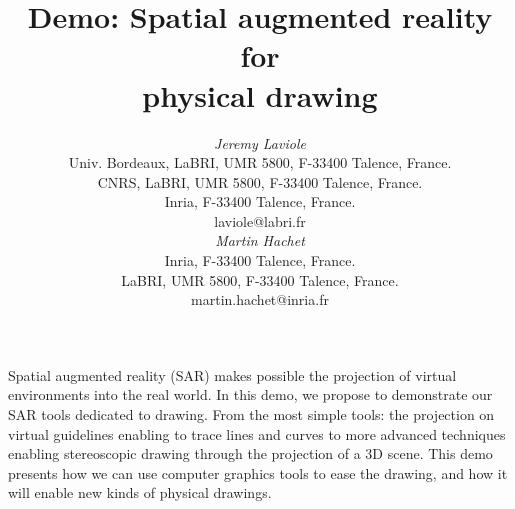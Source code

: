 \documentclass{article}
\begin{document}




\title{Demo: Spatial augmented reality for \\
       physical drawing}



\author{
\parbox[t]{9cm}{\centering
	     {\em Jeremy Laviole}\\
	     Univ. Bordeaux, LaBRI, UMR 5800, F-33400 Talence, France.\\
         CNRS, LaBRI, UMR 5800, F-33400 Talence, France.\\
	     Inria, F-33400 Talence, France.\\
	     laviole@labri.fr \vspace*{-0.5cm}}
\parbox[t]{9cm}{\centering
	     {\em Martin Hachet}\\
	     Inria, F-33400 Talence, France.\\
	     LaBRI, UMR 5800, F-33400 Talence, France.\\
	     martin.hachet@inria.fr}
}


\maketitle

\abstract
Spatial augmented reality (SAR) makes possible the projection of virtual environments into the real world. In this demo, we propose to demonstrate our SAR tools dedicated to drawing. 
From the most simple tools: the projection on virtual guidelines enabling to trace lines and curves  to more advanced techniques enabling stereoscopic drawing through the projection of a 3D scene. This demo presents how we can use computer graphics tools to ease the drawing, and how it will enable new kinds of physical drawings. 
\end{document}
